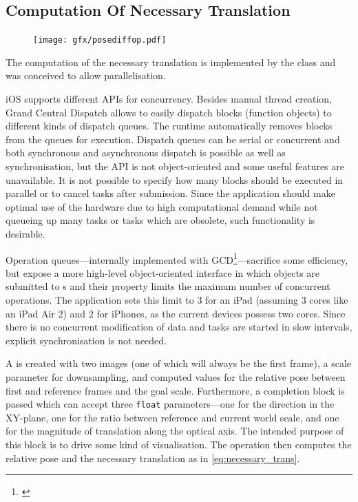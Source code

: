 \subsection{Computation Of Necessary Translation}

\begin{figure}
   \texttt{[image: gfx/posediffop.pdf]}
\end{figure}
The computation of the necessary translation is implemented by the
 class and was conceived to allow
parallelisation.

iOS supports different APIs for concurrency. Besides manual thread creation,
Grand Central Dispatch allows to easily dispatch blocks (function objects) to
different kinds of dispatch queues. The runtime automatically removes blocks
from the queues for execution. Dispatch queues can be serial or concurrent and both
synchronous and asynchronous dispatch is possible as well as synchronisation,
but the API is not object-oriented and some useful features are unavailable. It
is not possible to specify how many blocks should be executed in parallel or to
cancel tasks after submission. Since the application should make optimal use of
the hardware due to high computational demand while not queueing up many tasks
or tasks which are obsolete, such functionality is desirable.

Operation queues---internally implemented with
GCD\footnote{\citep{nsopgcd}}---sacrifice some efficiency, but expose a more
high-level object-oriented interface in which  objects are
submitted to s and their
 property limits the maximum number of
concurrent operations. The application sets this limit to $3$ for an iPad
(assuming $3$ cores like an iPad Air 2) and $2$ for iPhones, as the current
devices possess two cores. Since there is no concurrent modification of data and
tasks are started in slow intervals, explicit synchronisation is not needed.

A  is created with two images (one of
which will always be the first frame), a scale parameter for downsampling, and
computed values for the relative pose between first and reference frames and the
goal scale. Furthermore, a completion block is passed which can accept three \texttt{float}
parameters---one for the direction in the XY-plane, one for the ratio between
reference and current world scale, and one for the magnitude of translation along
the optical axis. The intended purpose of this block is to drive some kind of
visualisation. The operation then computes the relative pose and the necessary
translation as in \eqref{eq:necessary_trans}. 


